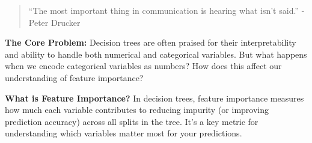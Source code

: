 \documentclass[
  letterpaper,
  DIV=11,
  numbers=noendperiod]{scrartcl}
\begin{document}
\begin{quote}
``The most important thing in communication is hearing what isn't
said.'' - Peter Drucker
\end{quote}

\textbf{The Core Problem:} Decision trees are often praised for their
interpretability and ability to handle both numerical and categorical
variables. But what happens when we encode categorical variables as
numbers? How does this affect our understanding of feature importance?

\textbf{What is Feature Importance?} In decision trees, feature
importance measures how much each variable contributes to reducing
impurity (or improving prediction accuracy) across all splits in the
tree. It's a key metric for understanding which variables matter most
for your predictions.
\end{document}
